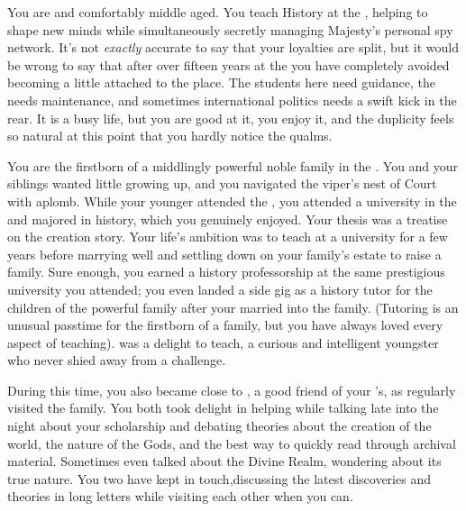 \documentclass[char]{GL2020}
\begin{document}
\name{\cHistory{}}

You are \cHistory{\intro} and comfortably middle aged. You teach History at the \pSchool{}, helping to shape new minds while simultaneously secretly managing \cQueen{\Their} Majesty's personal spy network. It's not \emph{exactly} accurate to say that your loyalties are split, but it would be wrong to say that after over fifteen years at the \pSchool{} you have completely avoided becoming a little attached to the place. The students here need guidance, the \pSc{} needs maintenance, and sometimes international politics needs a swift kick in the rear. It is a busy life, but you are good at it, you enjoy it, and the duplicity feels so natural at this point that you hardly notice the qualms.

You are the firstborn \cHistory{\offspring} of a middlingly powerful noble family in the \pFarm{}. You and your siblings wanted little growing up, and you navigated the viper's nest of Court with aplomb. While your younger \cWildCardFriend{\sibling} \cWildCardFriend{\intro} attended the \pSchool{}, you attended a university in the \pFarm{} and majored in history, which you genuinely enjoyed. Your thesis was a treatise on the creation story. Your life's ambition was to teach at a \pFarm{} university for a few years before marrying well and settling down on your family's estate to raise a family. Sure enough, you earned a history professorship at the same prestigious university you attended; you even landed a side gig as a history tutor for the children of the powerful \cChupStudent{\formal} family after your \cWildCardFriend{\sibling} married into the family. (Tutoring is an unusual passtime for the firstborn of a family, but you have always loved every aspect of teaching). \cChupStudent{\intro} was a delight to teach, a curious and intelligent youngster who never shied away from a challenge.

During this time, you also became close to \cWildCard{\intro}, a good friend of your \cWildCardFriend{\sibling}’s, as \cWildCard{\they} regularly visited the \cChupStudent{\formal} family. You both took delight in helping \cChupStudent{} while talking late into the night about your scholarship and debating theories about the creation of the world, the nature of the Gods, and the best way to quickly read through archival material. Sometimes \cWildCard{\they} even talked about the Divine Realm, wondering about its true nature. You two have kept in touch,discussing the latest discoveries and theories in long letters while visiting each other when you can. 
\end{document}
